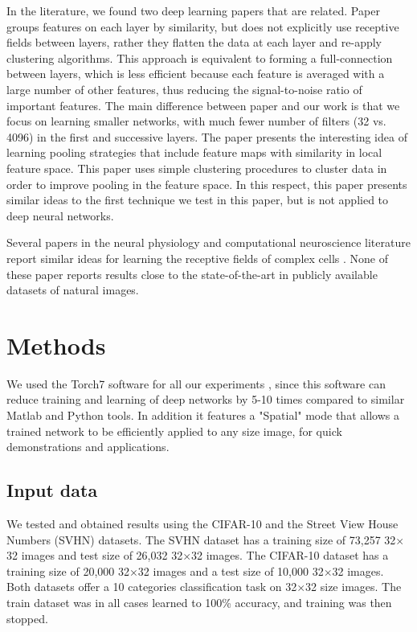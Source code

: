 \documentclass{article} %
\begin{document}
In the literature, we found two deep learning papers that are related. 
Paper \cite{coates2012learning} groups features on each layer by similarity, but does not explicitly use receptive fields between layers, 
rather they flatten the data at each layer and re-apply clustering algorithms. 
This approach is equivalent to forming a full-connection between layers, 
which is less efficient because each feature is averaged with a large number of other features, thus reducing the signal-to-noise ratio of important features.
The main difference between paper \cite{coates2012learning} and our work is that we focus on learning smaller networks,
with much fewer number of filters (32 vs. 4096) in the first and successive layers. 
The paper \cite{boureau_2011} presents the interesting idea of learning pooling strategies that include feature maps with similarity in local feature space. 
This paper uses simple clustering procedures to cluster data in order to improve pooling in the feature space. 
In this respect, this paper presents similar ideas to the first technique we test in this paper, but is not applied to deep neural networks.

Several papers in the neural physiology and computational neuroscience literature report similar ideas for learning the receptive fields of complex cells \cite{masquelier2007learning,spratling2005learning,wiskott2002slow,wallis1997invariant}. None of these paper reports results close to the state-of-the-art in publicly available datasets of natural images.




\section{Methods}
\label{sec-methods}

We used the Torch7 software for all our experiments \cite{collobert_torch7_2011}, since this software can reduce training and learning of deep networks
by 5-10 times compared to similar Matlab and Python tools.
In addition it features a "Spatial" mode that allows a trained network to be efficiently applied to any size image, for quick demonstrations and applications.


\subsection{Input data}

We tested and obtained results using the CIFAR-10 \cite{krizhevsky_learning_2009} and the Street View House Numbers (SVHN) \cite{netzer_reading_2011} datasets.
The SVHN dataset has a training size of 73,257 32$\times$32 images and test size of 26,032 32$\times$32 images.
The CIFAR-10 dataset has a training size of 20,000 32$\times$32 images and a test size of 10,000 32$\times$32 images.
Both datasets offer a 10 categories classification task on 32$\times$32 size images.
The train dataset was in all cases learned to 100\% accuracy, and training was then stopped. 
\end{document}
